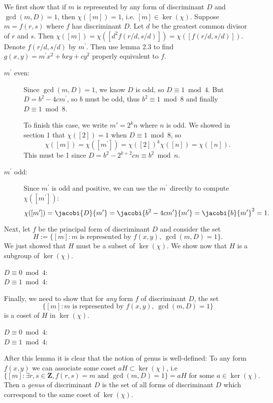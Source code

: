We first show that if $m$ is represented by any form of discriminant $D$ and $\gcd(m,D)=1$, then $\chi([m])=1$, i.e. $[m]\in\ker(\chi)$. Suppose $m=f(r,s)$ where $f$ has discriminant $D$. Let $d$ be the greatest common divisor of $r$ and $s$. Then $\chi([m])=\chi([d^2f(r/d, s/d)])=\chi([f(r/d, s/d)]).$ Denote $f(r/d, s/d)$ by $m^\prime$. Then use lemma 2.3 to find $g(x,y)=m^\prime x^2+bxy+cy^2$ properly equivalent to $f$.
\begin{description}
  \item [$m^\prime$ even:]
    Since $\gcd(m, D)=1$, we know $D$ is odd, so $D\equiv 1\bmod 4$. But $D=b^2-4cm^\prime$, so $b$ must be odd, thus $b^2\equiv 1\bmod 8$ and finally $D\equiv 1\bmod 8$.

    To finish this case, we write $m\prime=2^kn$ where $n$ is odd. We showed in section 1 that $\chi([2])=1$ when $D\equiv 1\bmod 8$, so
    \[\chi([m])=\chi([m^\prime])=\chi([2])^k\chi([n])=\chi([n]).\]
    This must be 1 since $D=b^2-2^{k+2}cn\equiv b^2\bmod n$.

  \item [$m^\prime$ odd:]
    Since $m^\prime$ is odd and positive, we can use the $m^\prime$ directly to compute $\chi([m^\prime])$:
    \[\chi([m^\prime])=\jacobi{D}{m^\prime}=\jacobi{b^2-4cm^\prime}{m^\prime}=\jacobi{b}{m^\prime}^2=1.\]
\end{description}

Next, let $f$ be the principal form of discriminant $D$ and consider the set
\[H:=\{[m]: m\text{ is represented by }f(x,y),\ \gcd(m, D)=1\}.\]
We just showed that $H$ must be a subset of $\ker(\chi)$. We show now that $H$ is a subgroup of $\ker(\chi)$.
\begin{description}
  \item [$D\equiv 0\bmod 4$:]
  \item [$D\equiv 1\bmod 4$:]
\end{description}

Finally, we need to show that for \emph{any} form $f$ of discriminant $D$, the set
\[\{[m]: m\text{ is represented by }f(x,y),\ \gcd(m, D)=1\}\]
is a coset of $H$ in $\ker(\chi)$.
\begin{description}
  \item [$D\equiv 0\bmod 4$:]
  \item [$D\equiv 1\bmod 4$:]
\end{description}

After this lemma it is clear that the notion of genus is well-defined: To any form $f(x,y)$ we can associate some coset $aH\subset\ker(\chi)$, i.e
\[\{[m]:\exists r,s\in\mathbf{Z}, f(r,s)=m\text{ and }\gcd(m,D)=1\}=aH\text{ for some }a\in\ker(\chi).\]
Then a \emph{genus} of discriminant $D$ is the set of all forms of discriminant $D$ which correspond to the same coset of $\ker(\chi)$.

